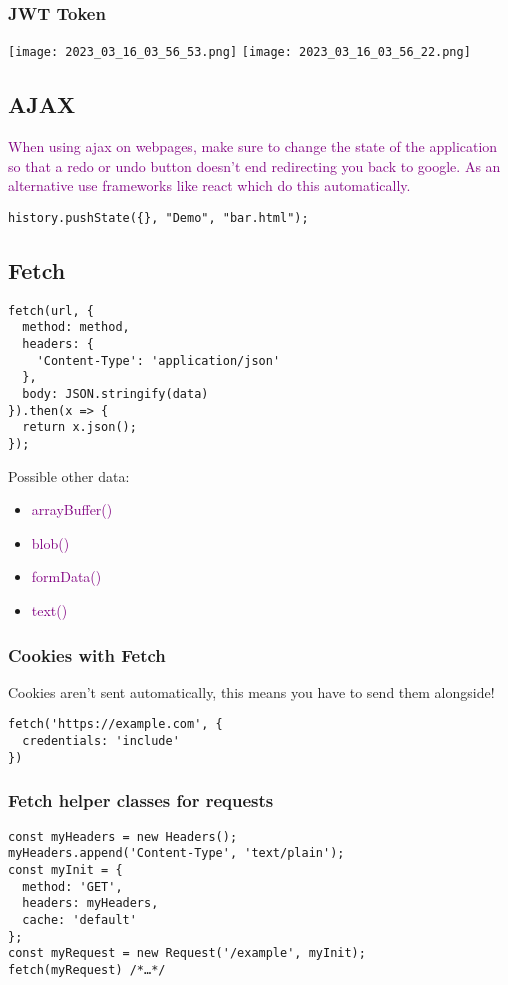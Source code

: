 \documentclass[main.tex,fontsize=8pt,paper=a4,paper=portrait,DIV=calc,]{scrartcl}
\begin{document}
\subsubsection{JWT Token}
\texttt{[image: 2023\_03\_16\_03\_56\_53.png]}
\texttt{[image: 2023\_03\_16\_03\_56\_22.png]}

\subsection{AJAX}
\textcolor{purple}{When using ajax on webpages, make sure to change the state of the application so that a redo or undo button doesn't end redirecting you back to google. \newline
As an alternative use frameworks like react which do this automatically.}
\begin{lstlisting}
history.pushState({}, "Demo", "bar.html");
\end{lstlisting}

\subsection{Fetch}
\begin{lstlisting}
fetch(url, {
  method: method,
  headers: {
    'Content-Type': 'application/json'
  },
  body: JSON.stringify(data)
}).then(x => {
  return x.json();
});
\end{lstlisting}
Possible other data: 
\begin{itemize}
\item \textcolor{purple}{arrayBuffer()}
\item \textcolor{purple}{blob()}
\item \textcolor{purple}{formData()}
\item \textcolor{purple}{text()}
\end{itemize} 

\subsubsection{Cookies with Fetch}
Cookies aren't sent automatically, this means you have to send them alongside!
\begin{lstlisting}
fetch('https://example.com', {
  credentials: 'include'
})
\end{lstlisting}

\subsubsection{Fetch helper classes for requests}
\begin{lstlisting}
const myHeaders = new Headers();
myHeaders.append('Content-Type', 'text/plain');
const myInit = {
  method: 'GET',
  headers: myHeaders,
  cache: 'default'
};
const myRequest = new Request('/example', myInit);
fetch(myRequest) /*…*/
\end{lstlisting}
\end{document}
